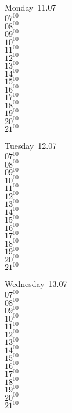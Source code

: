 \documentclass[11pt,a4paper]{book}\usepackage[]{graphicx}\usepackage[]{color}
\begin{document}
\begin{headerbox}
\end{headerbox}
\begin{weekdaybox}
  Monday~11.07\\
  { 
  \vfill
  $07^{00}$\\
$08^{00}$\\
$09^{00}$\\
$10^{00}$\\
$11^{00}$\\
$12^{00}$\\
$13^{00}$\\
$14^{00}$\\
$15^{00}$\\
$16^{00}$\\
$17^{00}$\\
$18^{00}$\\
$19^{00}$\\
$20^{00}$\\
$21^{00}$\\
  }
\end{weekdaybox}
\begin{weekdaybox}
  Tuesday~12.07\\
  { 
  \vfill
  $07^{00}$\\
$08^{00}$\\
$09^{00}$\\
$10^{00}$\\
$11^{00}$\\
$12^{00}$\\
$13^{00}$\\
$14^{00}$\\
$15^{00}$\\
$16^{00}$\\
$17^{00}$\\
$18^{00}$\\
$19^{00}$\\
$20^{00}$\\
$21^{00}$\\
  }
\end{weekdaybox}
\begin{weekdaybox}
  Wednesday~13.07\\
  { 
  \vfill
  $07^{00}$\\
$08^{00}$\\
$09^{00}$\\
$10^{00}$\\
$11^{00}$\\
$12^{00}$\\
$13^{00}$\\
$14^{00}$\\
$15^{00}$\\
$16^{00}$\\
$17^{00}$\\
$18^{00}$\\
$19^{00}$\\
$20^{00}$\\
$21^{00}$\\
  }
\end{weekdaybox}
\end{document}
